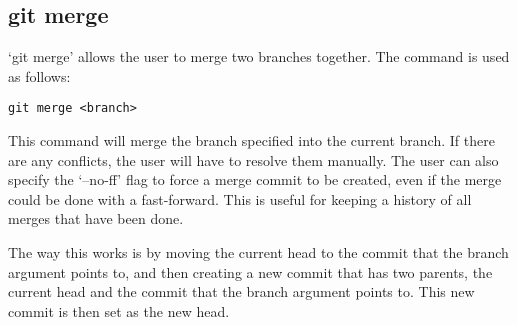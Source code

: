 \subsection{git merge}
`git merge' allows the user to merge two branches together. The command is used as follows:
\begin{verbatim}
git merge <branch> 
\end{verbatim}
This command will merge the branch specified into the current branch. If there are any conflicts, the user will have to resolve them manually. The user can also specify the `--no-ff' flag to force a merge commit to be created, even if the merge could be done with a fast-forward. This is useful for keeping a history of all merges that have been done.

The way this works is by moving the current head to the commit that the branch argument points to, and then creating a new commit that has two parents, the current head and the commit that the branch argument points to. This new commit is then set as the new head.